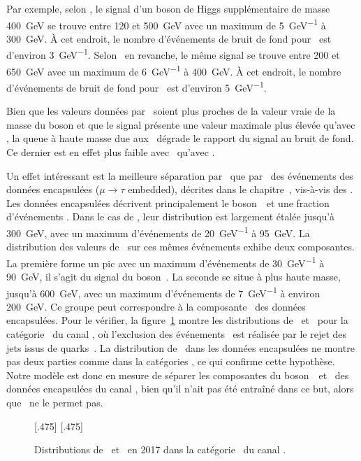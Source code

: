 Par exemple,
selon \mTtot,
le signal d'un boson de Higgs supplémentaire de masse \SI{400}{\GeV} se trouve
entre \num{120} et \SI{500}{\GeV}
avec un maximum de \SI{5}{\GeV^{-1}} à \SI{300}{\GeV}.
À cet endroit, le nombre d'événements de bruit de fond pour \mTtot\ est d'environ \SI{3}{\GeV^{-1}}.
Selon \mml\ en revanche,
le même signal se trouve
entre \num{200} et \SI{650}{\GeV}
avec un maximum de \SI{6}{\GeV^{-1}} à \SI{400}{\GeV}.
À cet endroit, le nombre d'événements de bruit de fond pour \mml\ est d'environ \SI{5}{\GeV^{-1}}.
\par
Bien que les valeurs données par \mml\ soient plus proches de la valeur vraie de la masse du boson
et que le signal présente une valeur maximale plus élevée qu'avec \mTtot,
la queue à haute masse due aux \ftauhs\ dégrade le rapport du signal au bruit de fond.
Ce dernier est en effet plus faible avec \mml\ qu'avec \mTtot.
\par
Un effet intéressant est la meilleure séparation par \mml\ que par \mTtot\ des événements
des données encapsulées ($\mu\to\tau$ embedded), décrites dans le chapitre~,
vis-à-vis des \ftauhs.
Les données encapsulées décrivent principalement le boson~\Zboson\ et une fraction d'événements \ttbar.
Dans le cas de \mTtot,
leur distribution est 
largement étalée
jusqu'à \SI{300}{\GeV},
avec un maximum d'événements de \SI{20}{\GeV^{-1}} à \SI{95}{\GeV}.
La distribution des valeurs de \mml\ sur ces mêmes événements
exhibe deux composantes.
La première forme un pic
avec un maximum d'événements de \SI{30}{\GeV^{-1}} à \SI{90}{\GeV},
il s'agit du signal du boson~\Zboson.
La seconde se situe à plus haute masse,
jusqu'à \SI{600}{\GeV},
avec un maximum d'événements de \SI{7}{\GeV^{-1}} à environ \SI{200}{\GeV}.
Ce groupe peut correspondre à la composante \ttbar\ des données encapsulées.
Pour le vérifier, la figure~\ref{fig-distributions_mml_mttot_2017_tt_nobtag}
montre les distributions de \mTtot\ et \mml\ pour la catégorie \CATnobtag\ du canal \tauh\tauh,
où l'exclusion des événements \ttbar\ est réalisée par le rejet des jets issus de quarks~\quarkb.
La distribution de \mml\ dans les données encapsulées ne montre pas deux parties comme dans la catégories \CATbtag,
ce qui confirme cette hypothèse.
Notre modèle est donc en mesure de séparer les composantes du boson~\Zboson\ et \ttbar\ des données encapsulées du canal \tauh\tauh,
bien qu'il n'ait pas été entraîné dans ce but,
alors que \mTtot\ ne le permet pas.
\begin{figure}[h]
\centering

[.475\textwidth]
{}
\hfill
{}[.475\textwidth]
{}

\caption[Distributions de \mTtot\ et \mml\ dans la catégorie \CATnobtag\ du canal \tauh\tauh.]{Distributions de \mTtot\ et \mml\ en 2017 dans la catégorie \CATnobtag\ du canal \tauh\tauh.
}
\label{fig-distributions_mml_mttot_2017_tt_nobtag}
\end{figure}
